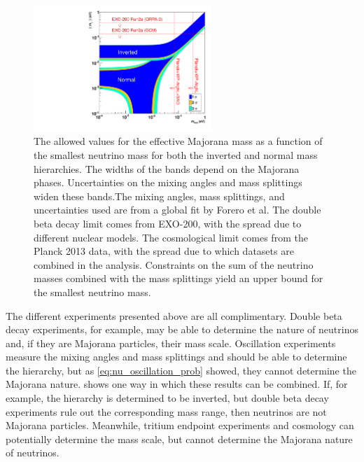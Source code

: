 \documentclass[herrin-thesis.tex]{subfiles}
\begin{document}
\begin{figure}[tbp]
	\centering
	\includegraphics[width=0.6\textwidth]{./plots/nu_meff_v_mmin.pdf}
	\caption[Effective Majorana mass vs. smallest neutrino mass]{The allowed values for the effective Majorana mass as a function of the smallest neutrino mass for both the inverted and normal mass hierarchies. The widths of the bands depend on the Majorana phases. Uncertainties on the mixing angles and mass splittings widen these bands.The mixing angles, mass splittings, and uncertainties used are from a global fit by Forero et al.\cite{Forero:2012cr} The double beta decay limit comes from EXO-200\cite{Auger:2012ar}, with the spread due to different nuclear models. The cosmological limit comes from the Planck 2013 data\cite{Ade:2013kl}, with the spread due to which datasets are combined in the analysis. Constraints on the sum of the neutrino masses combined with the mass splittings yield an upper bound for the smallest neutrino mass.}
	\label{fig:nu_meff_v_mmin}
\end{figure}

The different experiments presented above are all complimentary. Double beta decay experiments, for example, may be able to determine the nature of neutrinos and, if they are Majorana particles, their mass scale. Oscillation experiments measure the mixing angles and mass splittings and should be able to determine the hierarchy, but as \cref{eq:nu_oscillation_prob} showed, they cannot determine the Majorana nature.  shows one way in which these results can be combined. If, for example, the hierarchy is determined to be inverted, but double beta decay experiments rule out the corresponding mass range, then neutrinos are not Majorana particles. Meanwhile, tritium endpoint experiments and cosmology can potentially determine the mass scale, but cannot determine the Majorana nature of neutrinos.
\end{document}
